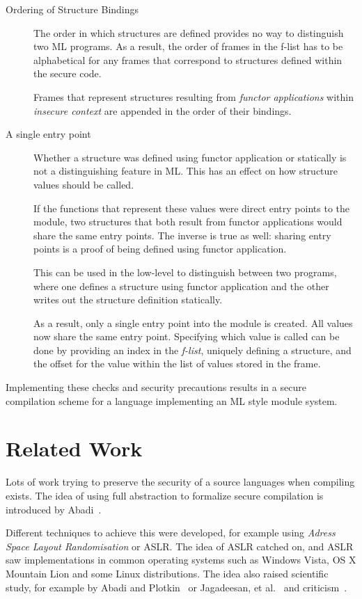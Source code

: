 \documentclass[11pt]{article}
\begin{document}
\begin{description}
\item[Ordering of Structure Bindings]
The order in which structures are defined provides no way to distinguish two ML programs.
As a result, the order of frames in the f-list has to be alphabetical for any frames that correspond to structures defined within the secure code.

Frames that represent structures resulting from \emph{functor applications} within \emph{insecure context} are appended in the order of their bindings.

\item[A single entry point]
Whether a structure was defined using functor application or statically is not a distinguishing feature in ML.
This has an effect on how structure values should be called.

If the functions that represent these values were direct entry points to the module, two structures that both result from functor applications would share the same entry points.
The inverse is true as well: sharing entry points is a proof of being defined using functor application.

This can be used in the low-level to distinguish between two programs, where one defines a structure using functor application and the other writes out the structure definition statically.

As a result, only a single entry point into the module is created. 
All values now share the same entry point.
Specifying which value is called can be done by providing an index in the \emph{f-list}, uniquely defining a structure, and the offset for the value within the list of values stored in the frame.
\end{description}

Implementing these checks and security precautions results in a secure compilation scheme for a language implementing an ML style module system.

\section{Related Work}
Lots of work trying to preserve the security of a source languages when compiling exists.
The idea of using full abstraction to formalize secure compilation is introduced by Abadi~\cite{Abadi}.

Different techniques to achieve this were developed, for example using \emph{Adress Space Layout Randomisation} or ASLR.%
The idea of ASLR catched on, and ASLR saw implementations in common operating systems such as Windows Vista, OS X Mountain Lion and some Linux distributions. 
The idea also raised scientific study, for example by Abadi and Plotkin~\cite{AbadiASLR} or Jagadeesan, et al.~\cite{Jagadeesan} and criticism~\cite{Shacham:2004:EAR:1030083.1030124,Strackx:2009:BMS:1519144.1519145}.
\end{document}
